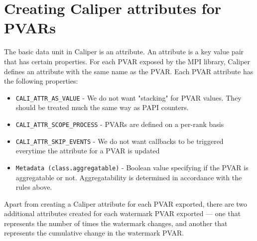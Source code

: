 \section{Creating Caliper attributes for PVARs}
The basic data unit in Caliper is an attribute. An attribute is a key value pair that has certain properties. For each PVAR exposed by the MPI library, Caliper defines an attribute with the same name as the PVAR. Each PVAR attribute has the following properties:
\begin{itemize}
	\item \verb+CALI_ATTR_AS_VALUE+ - We do not want "stacking" for PVAR values. They should be treated much the same way as PAPI counters.
	\item \verb+CALI_ATTR_SCOPE_PROCESS+ - PVARs are defined on a per-rank basis
	\item \verb+CALI_ATTR_SKIP_EVENTS+ - We do not want callbacks to be triggered everytime the attribute for a PVAR is updated
	\item \verb+Metadata (class.aggregatable)+ - Boolean value specifying if the PVAR is aggregatable or not. Aggregatability is determined in accordance with the rules above. 
\end{itemize}
Apart from creating a Caliper attribute for each PVAR exported, there are two additional attributes created for each watermark PVAR exported --- one that represents the number of times the watermark changes, and another that represents the cumulative change in the watermark PVAR. 

